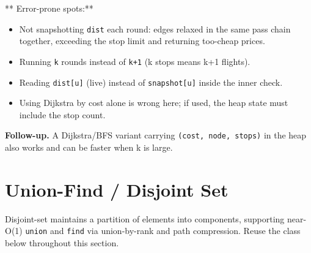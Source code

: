 \documentclass[11pt]{article}
\providecommand{\tightlist}{\setlength{\itemsep}{1pt}\setlength{\parskip}{0pt}}
\begin{document}
** Error-prone spots:**

\begin{itemize}
\tightlist
\item
  Not snapshotting \texttt{dist} each round: edges relaxed in the same pass chain together, exceeding the stop limit and returning too-cheap prices.
\item
  Running \texttt{k} rounds instead of \texttt{k+1} (k stops means k+1 flights).
\item
  Reading \texttt{dist{[}u{]}} (live) instead of \texttt{snapshot{[}u{]}} inside the inner check.
\item
  Using Dijkstra by cost alone is wrong here; if used, the heap state must include the stop count.
\end{itemize}

\textbf{Follow-up.} A Dijkstra/BFS variant carrying \texttt{(cost,\ node,\ stops)} in the heap also works and can be faster when k is large.

\section{Union-Find / Disjoint Set}\label{union-find--disjoint-set}

Disjoint-set maintains a partition of elements into components, supporting near-O(1) \texttt{union} and \texttt{find} via union-by-rank and path compression. Reuse the class below throughout this section.

\end{document}
